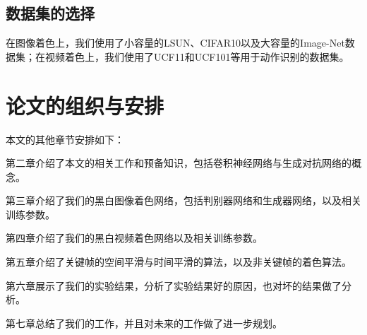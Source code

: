 \subsection{数据集的选择}
\label{sec:1-dataset}

  在图像着色上，我们使用了小容量的LSUN、CIFAR10以及大容量的Image-Net数据集；在视频着色上，我们使用了UCF11和UCF101等用于动作识别的数据集。

\section{论文的组织与安排}
\label{sec:1-org}

  本文的其他章节安排如下：

  第二章介绍了本文的相关工作和预备知识，包括卷积神经网络与生成对抗网络的概念。

  第三章介绍了我们的黑白图像着色网络，包括判别器网络和生成器网络，以及相关训练参数。

  第四章介绍了我们的黑白视频着色网络以及相关训练参数。

  第五章介绍了关键帧的空间平滑与时间平滑的算法，以及非关键帧的着色算法。

  第六章展示了我们的实验结果，分析了实验结果好的原因，也对坏的结果做了分析。

  第七章总结了我们的工作，并且对未来的工作做了进一步规划。